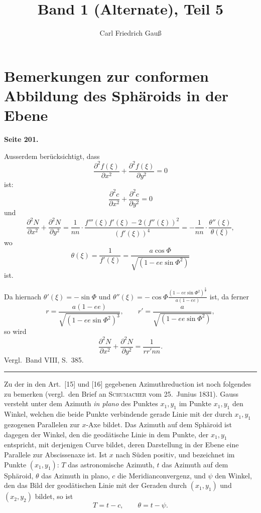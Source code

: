 \documentclass[12pt,a4paper]{article}
\title{Band 1 (Alternate), Teil 5}
\author{Carl Friedrich Gau\ss}
\date{}
\theoremstyle{plain}
\theoremstyle{definition}
\theoremstyle{remark}
\begin{document}
\maketitle

\section*{Bemerkungen zur conformen Abbildung des Sphäroids in der Ebene}


\textbf{Seite 201.}

Ausserdem berücksichtigt, dass
\[
\frac{\partial^2 f(\xi)}{\partial x^2} + \frac{\partial^2 f(\xi)}{\partial y^2} = 0
\]
ist:
\begin{equation}
\frac{\partial^2 c}{\partial x^2} + \frac{\partial^2 c}{\partial y^2} = 0
\end{equation}
und
\begin{equation}
\frac{\partial^2 N}{\partial x^2} + \frac{\partial^2 N}{\partial y^2}
= \frac{1}{nn} \cdot \frac{f'''(\xi) f'(\xi) - 2(f''(\xi))^2}{(f'(\xi))^4}
= -\frac{1}{nn} \cdot \frac{\theta''(\xi)}{\theta(\xi)},
\end{equation}
wo
\[
\theta(\xi) = \frac{1}{f'(\xi)} = \frac{a \cos \Phi}{\sqrt{(1 - ee \sin \Phi^2)}}
\]
ist.

Da hiernach $\theta'(\xi) = -\sin \Phi$ und
$\theta''(\xi) = -\cos \Phi \frac{(1 - ee \sin \Phi^2)^{\frac{3}{2}}}{a(1 - ee)}$
ist, da ferner
\[
r = \frac{a(1 - ee)}{\sqrt{(1 - ee \sin \Phi^2)^3}}, \qquad
r' = \frac{a}{\sqrt{(1 - ee \sin \Phi^2)}},
\]
so wird
\begin{equation}
\frac{\partial^2 N}{\partial x^2} + \frac{\partial^2 N}{\partial y^2} = \frac{1}{rr'nn}.
\end{equation}
Vergl.~Band VIII, S.~385.

\medskip
\hrule
\medskip

Zu der in den Art.~[15] und [16] gegebenen Azimuthreduction ist noch folgendes zu bemerken (vergl.~den Brief an \textsc{Schumacher} vom 25.~Junius 1831). Gauss versteht unter dem Azimuth \emph{in plano} des Punktes $x_1, y_1$ im Punkte $x_1, y_1$ den Winkel, welchen die beide Punkte verbindende gerade Linie mit der durch $x_1, y_1$ gezogenen Parallelen zur $x$-Axe bildet. Das Azimuth auf dem Sphäroid ist dagegen der Winkel, den die geodätische Linie in dem Punkte, der $x_1, y_1$ entspricht, mit derjenigen Curve bildet, deren Darstellung in der Ebene eine Parallele zur Abscissenaxe ist. Ist $x$ nach Süden positiv, und bezeichnet im Punkte $(x_1, y_1)$: $T$ das astronomische Azimuth, $t$ das Azimuth auf dem Sphäroid, $\theta$ das Azimuth in plano, $c$ die Meridianconvergenz, und $\psi$ den Winkel, den das Bild der geodätischen Linie mit der Geraden durch $(x_1, y_1)$ und $(x_2, y_2)$ bildet, so ist
\[
T = t - c, \qquad \theta = t - \psi.
\]
\end{document}
